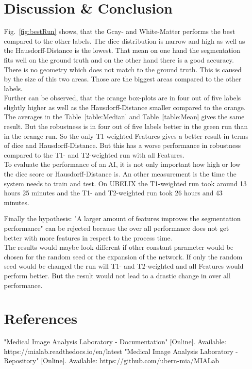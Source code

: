 \documentclass[conference]{IEEEtran}
\begin{document}
\section{Discussion \& Conclusion} \label{sec:Discussion \& Conclusion}
Fig.~\ref{fig:bestRun} shows, that the Gray- and White-Matter performs the best compared to the other labels. The dice distribution is narrow and high as well as the Hausdorff-Distance is the lowest. That mean on one hand the segmentation fits well on the ground truth and on the other hand there is a good accuracy. There is no geometry which does not match to the ground truth. This is caused by the size of this two areas. Those are the biggest areas compared to the other labels.\\
Further can be observed, that the orange box-plots are in four out of five labels slightly higher as well as the Hausdorff-Distance smaller compared to the orange. The averages in the Table~\ref{table:Median} and Table~\ref{table:Mean} gives the same result. But the robustness is in four out of five labels better in the green run than in the orange run. So the only T1-weighted Features gives a better result in terms of dice and Hausdorff-Distance. But this has a worse performance in robustness compared to the T1- and T2-weighted run with all Features.\\
To evaluate the performance of an AI, it is not only important how high or low the dice score or Hausdorff-Distance is. An other measurement is the time the system needs to train and test. On UBELIX the T1-weighted run took around 13 hours 25 minutes and the T1- and T2-weighted run took 26 hours and 43 minutes.

Finally the hypothesis: "A larger amount of features improves the segmentation performance" can be rejected because the over all performance does not get better with more features in respect to the process time.\\
The results would maybe look different if other constant parameter would be chosen for the random seed or the expansion of the network. If only the random seed would be changed the run will T1- and T2-weighted and all Features would perform better. But the result would not lead to a drastic change in over all performance.



\section{References}
\begin{thebibliography}{00}
 "Medical Image Analysis Laboratory - Documentation" [Online]. Available: https://mialab.readthedocs.io/en/latest
 "Medical Image Analysis Laboratory - Repository" [Online]. Available: https://github.com/ubern-mia/MIALab



\end{thebibliography}
\end{document}
